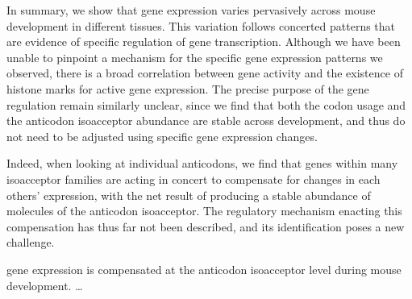 \parrule

In summary, we show that \trna gene expression varies pervasively across mouse
development in different tissues. This variation follows concerted patterns that
are evidence of specific regulation of \trna gene transcription. Although we
have been unable to pinpoint a mechanism for the specific gene expression
patterns  we observed, there is a broad correlation between \trna gene activity
and the existence of histone marks for active gene expression. The precise
purpose of the \trna gene regulation remain similarly unclear, since we find that
both the codon usage and the anticodon isoacceptor abundance are stable
across development, and thus do not need to be adjusted using specific \trna
gene expression changes.

Indeed, when looking at individual anticodons, we find that \trna genes within
many isoacceptor families are acting in concert to compensate for changes in
each others’ expression, with the net result of producing a stable abundance of
\trna molecules of the anticodon isoacceptor. The regulatory mechanism enacting
this compensation has thus far not been described, and its identification poses
a new challenge.

    {\trna gene expression is compensated at the anticodon isoacceptor level
    during mouse development.}
    {…}

